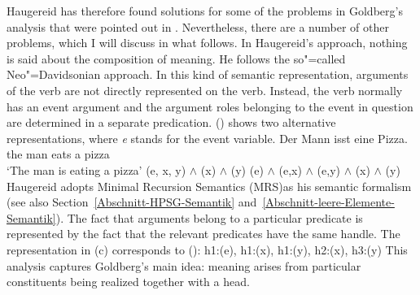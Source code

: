 \begin{exe}
\begin{xlist}[iv.]
\begin{exe}
\begin{xlist}[iv.]
\zl
Haugereid has therefore found solutions for some of the problems in Goldberg's analysis that were
pointed out in .
Nevertheless, there are a number of other problems, which I will discuss in what follows.
In Haugereid's approach, nothing is said about the composition of meaning. He follows the so"=called Neo"=Davidsonian approach.
In this kind of semantic representation, arguments of the verb are not directly represented on the verb.
Instead, the verb normally has an event argument and the argument roles belonging to the event in question are determined in a separate predication.
() shows two alternative representations, where \emph{e} stands for the event variable.
\eal
\ex 
\gll Der Mann isst eine Pizza.\\
	 the man eats a pizza\\
\glt `The man is eating a pizza'
\ex {}(e, x, y) $\wedge$ (x) $\wedge$ (y)
\ex {}(e) $\wedge$ (e,x) $\wedge$ (e,y) $\wedge$ (x) $\wedge$ (y)
\zl
\largerpage[2]
Haugereid adopts Minimal Recursion Semantics (MRS)\indexmrs as his semantic formalism (see also Section~\ref{Abschnitt-HPSG-Semantik} and~\ref{Abschnitt-leere-Elemente-Semantik}). 
The fact that arguments belong to a particular predicate is represented by the fact that the relevant predicates have the same handle. The representation in (c) corresponds
to ():
\ea
h1:(e), h1:(x), h1:(y), h2:(x), h3:(y)
\z
This analysis captures Goldberg's main idea: meaning arises from particular constituents being realized together with a head.


\end{xlist}
\end{exe}
\end{xlist}
\end{exe}
